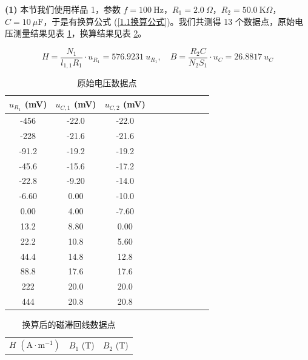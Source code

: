 \documentclass[UTF8]{article}
\def\kO{\ \mathrm{K}\Omega}
\def\uF{\ \mu\mathrm{F}}
\theoremstyle{MyLineTheoremStyle} %
\theoremstyle{MyBlockTheoremStyle} %
\theoremstyle{MySubsubsectionStyle} %
\begin{document}
\noindent \textbf{(1)} 本节我们使用样品 1，参数 $f = 100 \ \mathrm{Hz}$，$R_1 = 2.0 \ \Omega$，$R_2 = 50.0 \kO$，$C = 10 \uF$，于是有换算公式 (\ref{1.1换算公式})。我们共测得 13 个数据点，原始电压测量结果见表 \ref{1.1电压}，换算结果见表 \ref{1.1换算后}。

\begin{equation}\label{1.1换算公式}
    H = \frac{N_1}{l_{1, 1}R_1}\cdot u_{R_1} = 576.9231\  u_{R_1},\quad 
    B = \frac{R_2 C}{N_2 S_1}\cdot u_C = 26.8817 \ u_C
\end{equation}

\begin{center}\noindent\begin{minipage}{0.35\columnwidth}
\begin{table}[H]\centering
        \caption{原始电压数据点}
        \label{1.1电压}
    \begin{tabular}{cccccccccc}\toprule
$u_{R_1}$ (mV) & $u_{C, 1}$ (mV) & $u_{C, 2}$ (mV)  \\
\midrule
-456  & -22.0 & -22.0 \\
-228  & -21.6 & -21.6 \\
-91.2 & -19.2 & -19.2 \\
-45.6 & -15.6 & -17.2 \\
-22.8 & -9.20 & -14.0 \\
-6.60 & 0.00  & -10.0 \\
0.00  & 4.00  & -7.60 \\
13.2  & 8.80  & 0.00  \\
22.2  & 10.8  & 5.60  \\
44.4  & 14.8  & 12.8  \\
88.8  & 17.6  & 17.6  \\
222   & 20.0  & 20.0  \\
444   & 20.8  & 20.8  \\
        \bottomrule
    \end{tabular}
\end{table}
\end{minipage}\begin{minipage}{0.35\columnwidth}
\begin{table}[H]\centering
    \caption{换算后的磁滞回线数据点}
    \label{1.1换算后}
    \begin{tabular}{ccc}\toprule
$H$ $\mathrm{(A\cdot m^{-1})}$ & $B_1$ (T) & $B_2$ (T)  \\

\end{tabular}
\end{table}
\end{minipage}
\end{center}
\end{document}

